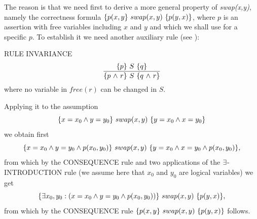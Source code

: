 \documentclass[manuscript, screen, review]{acmart}
\begin{document}
The reason is that we need first to derive a more general property of
\emph{swap(x,y)}, namely the correctness formula
$\mbox{$\{{p(x,y}\}\ {swap(x,y)}\ \{{p(y,x)}\}$}$, where $p$ is an assertion with free
variables including $x$ and $y$ and which we shall use for a specific
$p$.  To establish it we need another auxiliary rule (see \cite[page
468]{ABO09}):

\III

\NI
RULE \label{rul:inv} INVARIANCE
\[ 
 \frac{ \mbox{$\{{p}\}\ {S}\ \{{q}\}$} }
      { \mbox{$\{{p \mbox{$\ \wedge\ $} r}\}\ {S}\ \{{q \mbox{$\ \wedge\ $} r}\}$}         } 
\]
where no variable in $\mathit{free}(r)$ can be changed in $S$.
\III

Applying it to the assumption
\[
  \mbox{$\{{x=x_0 \wedge y=y_0}\}\ {swap(x,y)}\ \{{y=x_0 \wedge x=y_0}\}$}
\]
we obtain first
\[
  \mbox{$\{{x=x_0 \wedge y=y_0 \wedge p(x_0,y_0)}\}\ {swap(x,y)}\ \{{y=x_0 \wedge x=y_0 \wedge p(x_0,y_0)}\}$},
\]
from which by the CONSEQUENCE rule and two applications of
the $\mbox{$\exists$}$-INTRODUCTION rule (we assume here that $x_0$ and $y_0$ are logical variables)
we get
\[
  \mbox{$\{{\mbox{$\exists$} x_0, y_0: (x=x_0 \wedge y=y_0 \wedge p(x_0,y_0))}\}\ {swap(x,y)}\ \{{p(y,x)}\}$},
\]
from which  by the CONSEQUENCE rule $\mbox{$\{{p(x,y}\}\ {swap(x,y)}\ \{{p(y,x)}\}$}$ follows.


\end{document}
